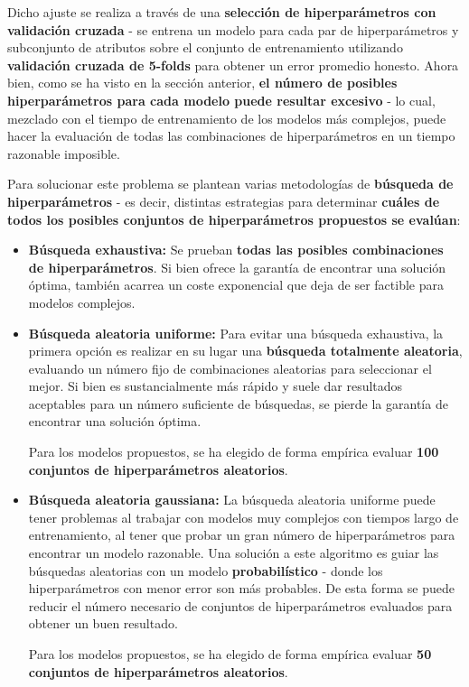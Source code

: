 Dicho ajuste se realiza a través de una \textbf{selección de hiperparámetros con validación cruzada} - se entrena un modelo para cada par de hiperparámetros y subconjunto de atributos sobre el conjunto de entrenamiento utilizando \textbf{validación cruzada de 5-folds} para obtener un error promedio honesto. Ahora bien, como se ha visto en la sección anterior, \textbf{el número de posibles hiperparámetros para cada modelo puede resultar excesivo} - lo cual, mezclado con el tiempo de entrenamiento de los modelos más complejos, puede hacer la evaluación de todas las combinaciones de hiperparámetros en un tiempo razonable imposible. 

Para solucionar este problema se plantean varias metodologías de \textbf{búsqueda de hiperparámetros} - es decir, distintas estrategias para determinar \textbf{cuáles de todos los posibles conjuntos de hiperparámetros propuestos se evalúan}:
\begin{itemize}%
	\item \textbf{Búsqueda exhaustiva:} Se prueban \textbf{todas las posibles combinaciones de hiperparámetros}. Si bien ofrece la garantía de encontrar una solución óptima, también acarrea un coste exponencial que deja de ser factible para modelos complejos.
	
	\item \textbf{Búsqueda aleatoria uniforme:} Para evitar una búsqueda exhaustiva, la primera opción es realizar en su lugar una \textbf{búsqueda totalmente aleatoria}, evaluando un número fijo de combinaciones aleatorias para seleccionar el mejor. Si bien es sustancialmente más rápido y suele dar resultados aceptables para un número suficiente de búsquedas, se pierde la garantía de encontrar una solución óptima.
	
	Para los modelos propuestos, se ha elegido de forma empírica evaluar \textbf{100 conjuntos de hiperparámetros aleatorios}.
	
	\item \textbf{Búsqueda aleatoria gaussiana:} La búsqueda aleatoria uniforme puede tener problemas al trabajar con modelos muy complejos con tiempos largo de entrenamiento, al tener que probar un gran número de hiperparámetros para encontrar un modelo razonable. Una solución a este algoritmo es guiar las búsquedas aleatorias con un modelo \textbf{probabilístico} - donde los hiperparámetros con menor error son más probables. De esta forma se puede reducir el número necesario de conjuntos de hiperparámetros evaluados para obtener un buen resultado. 
	
	Para los modelos propuestos, se ha elegido de forma empírica evaluar \textbf{50 conjuntos de hiperparámetros aleatorios}.
\end{itemize}

